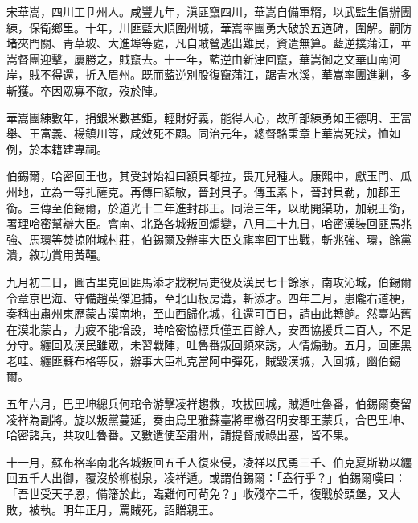 \begin{pinyinscope}
宋華嵩，四川工⼙州人。咸豐九年，滇匪竄四川，華嵩自備軍糈，以武監生倡辦團練，保衛鄉里。十年，川匪藍大順圍州城，華嵩率團勇大破於五道碑，圍解。嗣防堵夾門關、青草坡、大進埠等處，凡自賊營逃出難民，資遣無算。藍逆撲蒲江，華嵩督團迎擊，屢勝之，賊竄去。十一年，藍逆由新津回竄，華嵩御之文華山南河岸，賊不得還，折入眉州。既而藍逆別股復竄蒲江，踞青水溪，華嵩率團進剿，多斬獲。卒因眾寡不敵，歿於陣。

華嵩團練數年，捐銀米數甚鉅，輕財好義，能得人心，故所部練勇如王德明、王富舉、王富義、楊鎮川等，咸效死不顧。同治元年，總督駱秉章上華嵩死狀，恤如例，於本籍建專祠。

伯錫爾，哈密回王也，其受封始祖曰額貝都拉，畏兀兒種人。康熙中，獻玉門、瓜州地，立為一等扎薩克。再傳曰額敏，晉封貝子。傳玉素卜，晉封貝勒，加郡王銜。三傳至伯錫爾，於道光十二年進封郡王。同治三年，以助開渠功，加親王銜，署理哈密幫辦大臣。會南、北路各城叛回煽變，八月二十九日，哈密漢裝回匪馬兆強、馬環等焚掠附城村莊，伯錫爾及辦事大臣文祺率回丁出戰，斬兆強、環，餘黨潰，敘功賞用黃韁。

九月初二日，圖古里克回匪馬添才戕稅局吏役及漢民七十餘家，南攻沁城，伯錫爾令章京巴海、守備趙英傑追捕，至北山板房溝，斬添才。四年二月，患隴右道梗，奏稱由肅州東歷蒙古漠南地，至山西歸化城，往還可百日，請由此轉餉。然臺站舊在漠北蒙古，力疲不能增設，時哈密協標兵僅五百餘人，安西協援兵二百人，不足分守。纏回及漢民雖眾，未習戰陣，吐魯番叛回頻來誘，人情煽動。五月，回匪黑老哇、纏匪蘇布格等反，辦事大臣札克當阿中彈死，賊毀漢城，入回城，幽伯錫爾。

五年六月，巴里坤總兵何琯令游擊凌祥趨救，攻拔回城，賊遁吐魯番，伯錫爾奏留凌祥為副將。旋以叛黨蔓延，奏由烏里雅蘇臺將軍檄召明安郡王蒙兵，合巴里坤、哈密諸兵，共攻吐魯番。又數遣使至肅州，請提督成祿出塞，皆不果。

十一月，蘇布格率南北各城叛回五千人復來侵，凌祥以民勇三千、伯克夏斯勒以纏回五千人出御，覆沒於柳樹泉，凌祥遁。或謂伯錫爾：「盍行乎？」伯錫爾嘆曰：「吾世受天子恩，備籓於此，臨難何可茍免？」收殘卒二千，復戰於頭堡，又大敗，被執。明年正月，罵賊死，詔贈親王。


\end{pinyinscope}